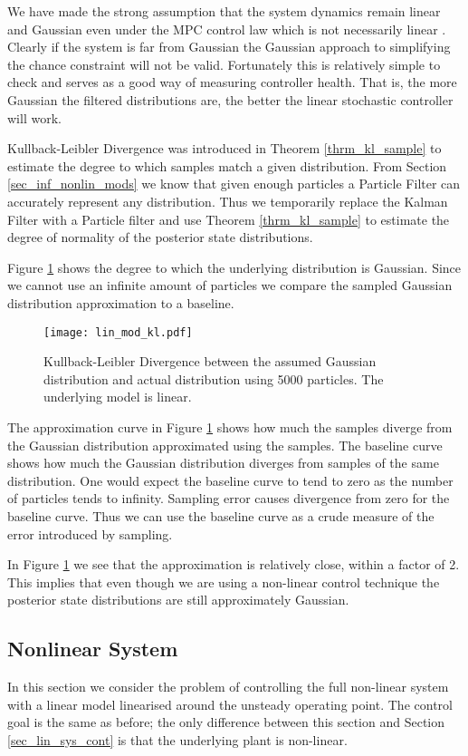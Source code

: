 We have made the strong assumption that the system dynamics remain linear and Gaussian even under the MPC control law which is not necessarily linear \cite{mac}. Clearly if the system is far from Gaussian the Gaussian approach to simplifying the chance constraint will not be valid. Fortunately this is relatively simple to check and serves as a good way of measuring controller health. That is, the more Gaussian the filtered distributions are, the better the linear stochastic controller will work. 

Kullback-Leibler Divergence was introduced in Theorem \ref{thrm_kl_sample} to estimate the degree to which samples match a given distribution. From Section \ref{sec_inf_nonlin_mods} we know that given enough particles a Particle Filter can accurately represent any distribution. Thus we temporarily replace the Kalman Filter with a Particle filter and use Theorem \ref{thrm_kl_sample} to estimate the degree of normality of the posterior state distributions.

Figure \ref{fig_lin_mod_kl} shows the degree to which the underlying distribution is Gaussian. Since we cannot use an infinite amount of particles we compare the sampled Gaussian distribution approximation to a baseline.   
\begin{figure}[H] 
\centering
\texttt{[image: lin\_mod\_kl.pdf]}
\caption{Kullback-Leibler Divergence between the assumed Gaussian distribution and actual distribution using 5000 particles. The underlying model is linear.}
\label{fig_lin_mod_kl}
\end{figure}
The approximation curve in Figure \ref{fig_lin_mod_kl} shows how much the samples diverge from the Gaussian distribution approximated using the samples. The baseline curve shows how much the Gaussian distribution diverges from samples of the same distribution. One would expect the baseline curve to tend to zero as the number of particles tends to infinity. Sampling error causes divergence from zero for the baseline curve. Thus we can use the baseline curve as a crude measure of the  error introduced by sampling.

In Figure \ref{fig_lin_mod_kl} we see that the approximation is relatively close, within a factor of 2. This implies that even though we are using a non-linear control technique the posterior state distributions are still approximately Gaussian. 


\subsection{Nonlinear System}
In this section we consider the problem of controlling the full non-linear system with a linear model linearised around the unsteady operating point. The control goal is the same as before; the only difference between this section and Section \ref{sec_lin_sys_cont} is that the underlying plant is non-linear.

